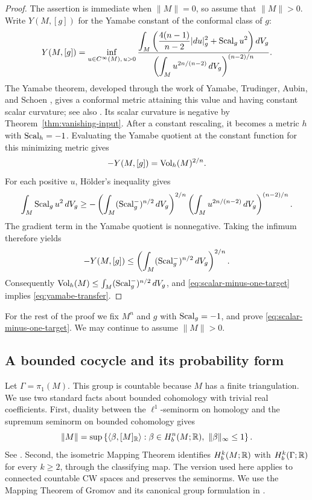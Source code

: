 \begin{proof}
The assertion is immediate when \(\|M\|=0\), so assume that
\(\|M\|>0\). Write \(Y(M,[g])\) for the Yamabe constant of the
conformal class of \(g\):
\[
Y(M,[g])=
\inf_{u\in C^\infty(M),\,u>0}
\frac{\displaystyle\int_M
  \left(\frac{4(n-1)}{n-2}|du|_g^2+\operatorname{Scal}_g u^2\right)dV_g}
{\displaystyle\left(\int_Mu^{2n/(n-2)}\,dV_g\right)^{(n-2)/n}}.
\]
The Yamabe theorem, developed through the work of Yamabe, Trudinger,
Aubin, and Schoen \cite{Yamabe1960,Trudinger1968,Aubin1976,Schoen1984},
gives a conformal metric attaining this value and having constant
scalar curvature; see also \cite[Section 11]{LeeParker1987}.
Its scalar curvature is negative by
Theorem~\ref{thm:vanishing-input}. After a constant rescaling, it becomes a
metric \(h\) with \(\operatorname{Scal}_h=-1\). Evaluating the Yamabe quotient at the
constant function for this minimizing metric gives
\[
  -Y(M,[g])=\operatorname{Vol}_h(M)^{2/n}.
\]
For each positive \(u\), H\"older's inequality gives
\[
\int_M\operatorname{Scal}_g u^2\,dV_g
\ge
-\left(\int_M(\operatorname{Scal}_g^-)^{n/2}\,dV_g\right)^{2/n}
 \left(\int_Mu^{2n/(n-2)}\,dV_g\right)^{(n-2)/n}.
\]
The gradient term in the Yamabe quotient is nonnegative. Taking the
infimum therefore yields
\[
-Y(M,[g])
\le \left(\int_M(\operatorname{Scal}_g^-)^{n/2}\,dV_g\right)^{2/n}.
\]
Consequently \(\operatorname{Vol}_h(M)\le\int_M(\operatorname{Scal}_g^-)^{n/2}\,dV_g\), and
\eqref{eq:scalar-minus-one-target} implies
\eqref{eq:yamabe-transfer}.
\end{proof}

For the rest of the proof we fix \(M^n\) and \(g\) with
\(\operatorname{Scal}_g=-1\), and prove \eqref{eq:scalar-minus-one-target}. We may
continue to assume \(\|M\|>0\).

\subsection{A bounded cocycle and its probability form}

Let \(\Gamma=\pi_1(M)\). This group is countable because \(M\) has a
finite triangulation. We use two standard facts about bounded
cohomology with trivial real coefficients. First, duality between the
\(\ell^1\)-seminorm on homology and the supremum seminorm on bounded
cohomology gives
\begin{equation}
\|M\|=
\sup\left\{\langle\beta,[M]_{\mathbb R}\rangle:
 \beta\in H_b^n(M;\mathbb R),\ \|\beta\|_\infty\le1\right\}.
\label{eq:bounded-duality}
\end{equation}
See \cite[Section 1.1]{Gromov1982}.
Second, the isometric Mapping Theorem identifies \(H_b^k(M;\mathbb R)\) with
\(H_b^k(\Gamma;\mathbb R)\) for every \(k\ge2\), through the classifying map.
The version used here applies to connected countable CW spaces and
preserves the seminorms. We use the Mapping Theorem of Gromov
\cite[Section 3.1]{Gromov1982} and its canonical group formulation in
\cite[Theorems 8.3 and 8.6]{IvanovNotes}.

